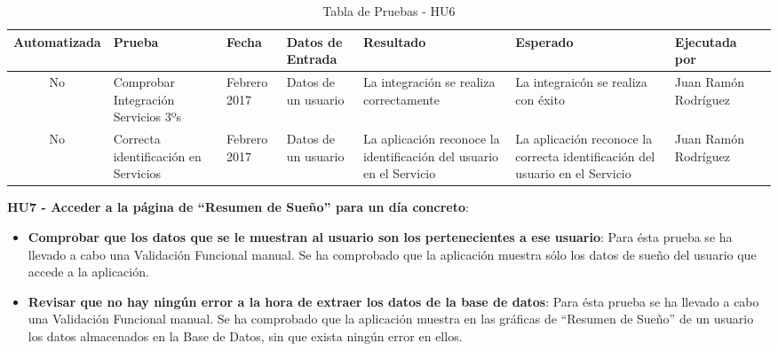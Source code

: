 \documentclass[11pt,openany]{book}
\begin{document}
{\tiny
\setlength{\LTleft}{-20cm plus -1fill}
\setlength{\LTright}{\LTleft}
\begin{center}
\begin{longtable}{| c | M{1.5cm} | M{1.5cm} | M{2.5cm} | M{1.5cm} | M{1.5cm} | M{1.5cm} | M{1.5cm} |}
\caption[Tabla de Pruebas - HU6]{Tabla de Pruebas - HU6} \label{grid_mlmmh} \\

\hline Automatizada & Prueba & Fecha & Datos de Entrada & Resultado & Esperado & Ejecutada por \\
\endfirsthead
\hline
No & Comprobar Integración Servicios 3ºs & Febrero 2017 & Datos de un usuario & La integración se realiza correctamente & La integraicón se realiza con éxito & Juan Ramón Rodríguez \\
\hline
No & Correcta identificación en Servicios & Febrero 2017 & Datos de un usuario & La aplicación reconoce la identificación del usuario en el Servicio & La aplicación reconoce la correcta identificación del usuario en el Servicio & Juan Ramón Rodríguez \\
\hline
\end{longtable}
\end{center}}
 
\textbf{HU7 -  Acceder a la página de ``Resumen de Sueño'' para un día concreto}:

\begin{itemize}
\item\textbf{Comprobar que los datos que se le muestran al usuario son los pertenecientes a ese usuario}: Para ésta prueba se ha llevado a cabo una Validación Funcional manual. Se ha comprobado que la aplicación muestra sólo los datos de sueño del usuario que accede a la aplicación.
\item\textbf{Revisar que no hay ningún error a la hora de extraer los datos de la base de datos}: Para ésta prueba se ha llevado a cabo una Validación Funcional manual. Se ha comprobado que la aplicación muestra en las gráficas de ``Resumen de Sueño'' de un usuario los datos almacenados en la Base de Datos, sin que exista ningún error en ellos.
\end{itemize}
\end{document}
